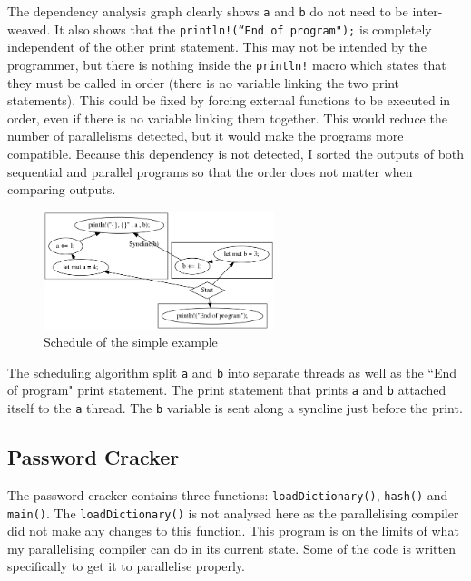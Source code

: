 The dependency analysis graph clearly shows \texttt{a} and \texttt{b} do not need to be inter-weaved. It also shows that the \texttt{println!(``End of program");} is completely independent of the other print statement. This may not be intended by the programmer, but there is nothing inside the \texttt{println!} macro which states that they must be called in order (there is no variable linking the two print statements). This could be fixed by forcing external functions to be executed in order, even if there is no variable linking them together. This would reduce the number of parallelisms detected, but it would make the programs more compatible. Because this dependency is not detected, I sorted the outputs of both sequential and parallel programs so that the order does not matter when comparing outputs.

\begin{figure}[H]
    \centering
    \includegraphics[width=0.6\textwidth]{img/simple-example/main-schedule.png}
    \caption{Schedule of the simple example}
\end{figure}

The scheduling algorithm split \texttt{a} and \texttt{b} into separate threads as well as the ``End of program" print statement. The print statement that prints \texttt{a} and \texttt{b} attached itself to the \texttt{a} thread. The \texttt{b} variable is sent along a syncline just before the print.

\subsection{Password Cracker}
The password cracker contains three functions: \texttt{loadDictionary()}, \texttt{hash()} and \texttt{main()}. The \texttt{loadDictionary()} is not analysed here as the parallelising compiler did not make any changes to this function. This program is on the limits of what my parallelising compiler can do in its current state. Some of the code is written specifically to get it to parallelise properly.

